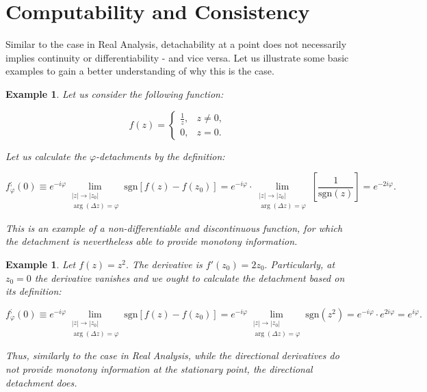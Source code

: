 \documentclass[11pt]{book}
\newtheorem{exm}[thm]{Example}
\begin{document}
\section{Computability and Consistency}
Similar to the case in Real Analysis, detachability at a point does not necessarily implies continuity or differentiability - and vice versa. Let us illustrate some basic examples to gain a better understanding of why this is the case.

\begin{exm}Let us consider the following function:

$$f\left(z\right)=\begin{cases}
\frac{1}{z}, & z\neq0,\\
0, & z=0.
\end{cases}$$

Let us calculate the $\varphi$-detachments by the definition:

$$f_{\varphi}^{;}\left(0\right)\equiv e^{-i\varphi}\underset{\begin{array}{c}
\left|z\right|\to\left|z_{0}\right|\\
\arg\left(\Delta z\right)=\varphi
\end{array}}{\lim}\text{sgn}\left[f\left(z\right)-f\left(z_{0}\right)\right]=e^{-i\varphi}\cdot\underset{\begin{array}{c}
\left|z\right|\to\left|z_{0}\right|\\
\arg\left(\Delta z\right)=\varphi
\end{array}}{\lim}\left[\frac{1}{\text{sgn}\left(z\right)}\right]=e^{-2i\varphi}.$$

This is an example of a non-differentiable and discontinuous function, for which the detachment is nevertheless able to provide monotony information.
\end{exm}

\begin{exm}Let $f\left(z\right)=z^{2}.$ The derivative is $f'\left(z_{0}\right)=2z_{0}.$ Particularly, at $z_{0}=0$ the derivative vanishes and we ought to calculate the detachment based on its definition:

$$f_{\varphi}^{;}\left(0\right)\equiv e^{-i\varphi}\underset{\begin{array}{c}
\left|z\right|\to\left|z_{0}\right|\\
\arg\left(\Delta z\right)=\varphi
\end{array}}{\lim}\text{sgn}\left[f\left(z\right)-f\left(z_{0}\right)\right]=e^{-i\varphi}\underset{\begin{array}{c}
\left|z\right|\to\left|z_{0}\right|\\
\arg\left(\Delta z\right)=\varphi
\end{array}}{\lim}\text{sgn}\left(z^{2}\right)=e^{-i\varphi}\cdot e^{2i\varphi}=e^{i\varphi}.$$

Thus, similarly to the case in Real Analysis, while the directional derivatives do not provide monotony information at the stationary point, the directional detachment does.
\end{exm}
\end{document}
